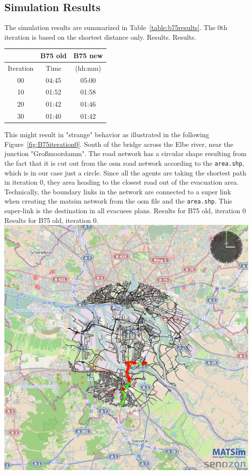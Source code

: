 \subsection{Simulation Results}
The simulation results are summarized in Table~\ref{table:b75results}. The 0th iteration is based on the shortest distance only. 
%
\createtable%
{Results.}%
{Results.}%
{\label{table:b75results}}%
{%
\begin{tabular}{|c|c|c|}
	\hline \rule[-2ex]{0pt}{5.5ex}  & B75 old & B75 new \\ 
	\hline \rule[-2ex]{0pt}{5.5ex}  Iteration & Time &  (hh:mm) \\ 
	\hline \rule[-2ex]{0pt}{5.5ex}  00 & 04:45 &  05:00\\ 
	\hline \rule[-2ex]{0pt}{5.5ex}  10 & 01:52 &  01:58\\ 
	\hline \rule[-2ex]{0pt}{5.5ex}  20 & 01:42 &  01:46\\ 
	\hline \rule[-2ex]{0pt}{5.5ex}  30 & 01:40 &  01:42\\ 
	\hline 
\end{tabular}
}%
{}%
%
This might result in "strange" behavior as illustrated in the following Figure~\ref{fig:B75iteration0}. South of the bridge across the Elbe river, near the junction "Gro{\ss}moordamm". The road network has a circular shape resulting from the fact that it is cut out from the osm road network according to the \lstinline|area.shp|, which is in our case just a circle. Since all the agents are taking the shortest path in iteration 0, they area heading to the closest road out of the evacuation area. Technically, the boundary links in the network are connected to a super link when creating the \gls{matsim} network from the \gls{osm} file and the \lstinline|area.shp|. This super-link is the destination in all evacuees plans. 
%
\createfigure%
{Results for B75 old, iteration 0}%
{Results for B75 old, iteration 0.}%
{\label{fig:B75iteration0}}%
{\includegraphics[width=0.7\linewidth]{using/figures/B75iteration0}}%
